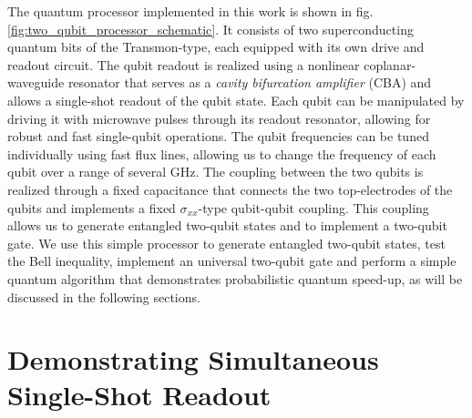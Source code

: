 The quantum processor implemented in this work is shown in fig. \ref{fig:two_qubit_processor_schematic}. It consists of two superconducting quantum bits of the Transmon-type, each equipped with its own drive and readout circuit. The qubit readout is realized using a nonlinear coplanar-waveguide resonator that serves as a {\it cavity bifurcation amplifier} (CBA)\citep{siddiqi_dispersive_2006,mallet_single-shot_2009,vijay_invited_2009} and allows a single-shot readout of the qubit state. Each qubit can be manipulated by driving it with microwave pulses through its readout resonator, allowing for robust and fast single-qubit operations. The qubit frequencies can be tuned individually using fast flux lines, allowing us to change the frequency of each qubit over a range of several GHz. The coupling between the two qubits is realized through a fixed capacitance that connects the two top-electrodes of the qubits and implements a fixed $\sigma_{xx}$-type qubit-qubit coupling. This coupling allows us to generate entangled two-qubit states and to implement a two-qubit gate. We use this simple processor to generate entangled two-qubit states, test the Bell inequality, implement an universal two-qubit gate and perform a simple quantum algorithm that demonstrates probabilistic quantum speed-up, as will be discussed in the following sections.

\section{Demonstrating Simultaneous Single-Shot Readout}

